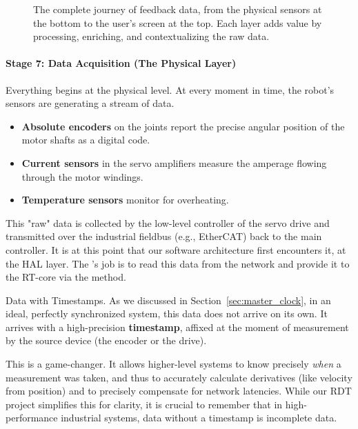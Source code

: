 \begin{figure}[h!]
\begin{tcolorbox}[width=\textwidth, title=The Feedback Pipeline]
    \end{tcolorbox}
    \caption{The complete journey of feedback data, from the physical sensors at the bottom to the user's screen at the top. Each layer adds value by processing, enriching, and contextualizing the raw data.}
    \label{fig:feedback_pipeline}
\end{figure}

\paragraph{Stage 7: Data Acquisition (The Physical Layer)}
Everything begins at the physical level. At every moment in time, the robot's sensors are generating a stream of data.
\begin{itemize}
    \item \textbf{Absolute encoders} on the joints report the precise angular position of the motor shafts as a digital code.
    \item \textbf{Current sensors} in the servo amplifiers measure the amperage flowing through the motor windings.
    \item \textbf{Temperature sensors} monitor for overheating.
\end{itemize}
This "raw" data is collected by the low-level controller of the servo drive and transmitted over the industrial fieldbus (e.g., EtherCAT) back to the main controller. It is at this point that our software architecture first encounters it, at the HAL layer. The 's job is to read this data from the network and provide it to the RT-core via the  method.

\begin{principlebox}{Data with Timestamps.}
    As we discussed in Section~\ref{sec:master_clock}, in an ideal, perfectly synchronized system, this data does not arrive on its own. It arrives with a high-precision \textbf{timestamp}, affixed at the moment of measurement by the source device (the encoder or the drive).
    
    This is a game-changer. It allows higher-level systems to know precisely \textit{when} a measurement was taken, and thus to accurately calculate derivatives (like velocity from position) and to precisely compensate for network latencies. While our RDT project simplifies this for clarity, it is crucial to remember that in high-performance industrial systems, data without a timestamp is incomplete data.
\end{principlebox}

